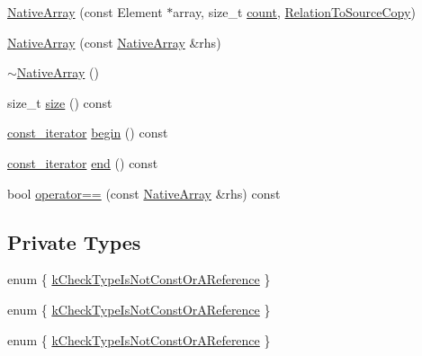 \begin{DoxyCompactItemize}
\item 
\mbox{\hyperlink{classtesting_1_1internal_1_1_native_array_ac184ee5741af5be3402213819c834405}{Native\+Array}} (const Element $\ast$array, size\+\_\+t \mbox{\hyperlink{_obj__test_2lib_2googletest-release-1_88_81_2googlemock_2test_2gmock__stress__test_8cc_afd9db40e3361ae09188795e8cbe19752}{count}}, \mbox{\hyperlink{structtesting_1_1internal_1_1_relation_to_source_copy}{Relation\+To\+Source\+Copy}})
\item 
\mbox{\hyperlink{classtesting_1_1internal_1_1_native_array_abb346ac3040f5da733f594cc2d5958bc}{Native\+Array}} (const \mbox{\hyperlink{classtesting_1_1internal_1_1_native_array}{Native\+Array}} \&rhs)
\item 
\mbox{\hyperlink{classtesting_1_1internal_1_1_native_array_a55ab5948d473a487303dcf6e02ad1f60}{$\sim$\+Native\+Array}} ()
\item 
size\+\_\+t \mbox{\hyperlink{classtesting_1_1internal_1_1_native_array_af96a4a5ca0cdd5d163c47a081f08bd89}{size}} () const
\item 
\mbox{\hyperlink{classtesting_1_1internal_1_1_native_array_a9ce7c8408460d7158a2870456d134557}{const\+\_\+iterator}} \mbox{\hyperlink{classtesting_1_1internal_1_1_native_array_a3046d93cfa23097e7b7c91f5f982dc78}{begin}} () const
\item 
\mbox{\hyperlink{classtesting_1_1internal_1_1_native_array_a9ce7c8408460d7158a2870456d134557}{const\+\_\+iterator}} \mbox{\hyperlink{classtesting_1_1internal_1_1_native_array_ae1cda748e49c6906421c6183c4d07c5a}{end}} () const
\item 
bool \mbox{\hyperlink{classtesting_1_1internal_1_1_native_array_a81b90f5739ed812610e68dc34c9e3850}{operator==}} (const \mbox{\hyperlink{classtesting_1_1internal_1_1_native_array}{Native\+Array}} \&rhs) const
\end{DoxyCompactItemize}
\subsection*{Private Types}
\begin{DoxyCompactItemize}
\item 
enum \{ \mbox{\hyperlink{classtesting_1_1internal_1_1_native_array_ab2e8098fefa03443ef600abcafeaaa05a7e37f893ba3a2046bd7360f53ebf2cf2}{k\+Check\+Type\+Is\+Not\+Const\+Or\+A\+Reference}}
 \}
\item 
enum \{ \mbox{\hyperlink{classtesting_1_1internal_1_1_native_array_ab2e8098fefa03443ef600abcafeaaa05a7e37f893ba3a2046bd7360f53ebf2cf2}{k\+Check\+Type\+Is\+Not\+Const\+Or\+A\+Reference}}
 \}
\item 
enum \{ \mbox{\hyperlink{classtesting_1_1internal_1_1_native_array_ab2e8098fefa03443ef600abcafeaaa05a7e37f893ba3a2046bd7360f53ebf2cf2}{k\+Check\+Type\+Is\+Not\+Const\+Or\+A\+Reference}}
 \}
\end{DoxyCompactItemize}
